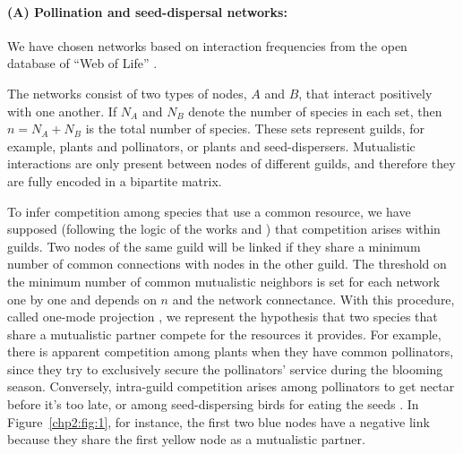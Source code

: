 \paragraph{(A) Pollination and seed-dispersal networks:} We have chosen networks based on interaction frequencies from the open database of ``Web of Life'' \cite{weboflife}. 

The networks consist of two types of nodes, $A$ and $B$, that  interact positively with one another. If $N_A$ and $N_B$ denote the number of species in each set, then $n = N_A + N_B$ is the total number of species. These sets represent guilds, for example, plants and pollinators, or plants and seed-dispersers. Mutualistic interactions are only present between nodes of different guilds, and therefore they are fully encoded in a bipartite matrix. 

To infer competition among species that use a common resource, we have supposed (following the logic of the works  \cite{Gracia-Lazaro2018TheEcosystems} and \cite{Wang2021InterspecificNetworks}) that competition arises within guilds.
Two nodes of the same guild will be linked if they share a minimum number of common connections with nodes in the other guild. The threshold on the minimum number of common mutualistic neighbors is set for each network one by one and depends on $n$ and the network connectance. With this procedure, called one-mode projection \cite{Newman2010}, we represent the hypothesis that two species that share a mutualistic partner compete for the resources it provides. For example, there is apparent competition among plants when they have common pollinators, since they try to exclusively secure the pollinators' service during the blooming season. Conversely, intra-guild competition arises among pollinators to get nectar before it's too late, or among seed-dispersing birds for eating the seeds \cite{Wang2021InterspecificNetworks}. In Figure~\ref{chp2:fig:1}, for instance, the first two blue nodes have a negative link because they share the first yellow node as a mutualistic partner. 

